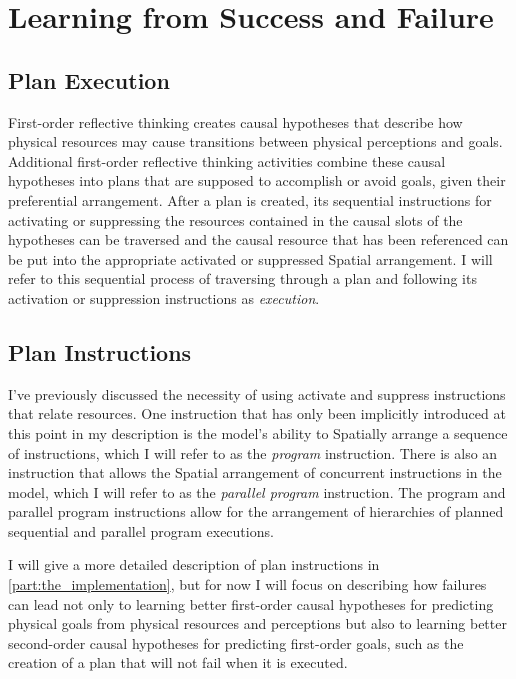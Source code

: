 \chapter{Learning from Success and Failure}
\label{chapter:learning_from_success_and_failure}

\section{Plan Execution}

First-order reflective thinking creates causal hypotheses that
describe how physical resources may cause transitions between physical
perceptions and goals.  Additional first-order reflective thinking
activities combine these causal hypotheses into plans that are
supposed to accomplish or avoid goals, given their preferential
arrangement.  After a plan is created, its sequential instructions for
activating or suppressing the resources contained in the causal slots
of the hypotheses can be traversed and the causal resource that has
been referenced can be put into the appropriate activated or
suppressed Spatial arrangement.  I will refer to this sequential
process of traversing through a plan and following its activation or
suppression instructions as \emph{execution}.

\section{Plan Instructions}

I've previously discussed the necessity of using activate and suppress
instructions that relate resources.  One instruction that has only
been implicitly introduced at this point in my description is the
model's ability to Spatially arrange a sequence of instructions, which
I will refer to as the \emph{program} instruction.  There is also an
instruction that allows the Spatial arrangement of concurrent
instructions in the model, which I will refer to as the \emph{parallel
  program} instruction.  The program and parallel program instructions
allow for the arrangement of hierarchies of planned sequential and
parallel program executions.

I will give a more detailed description of plan instructions in
\autoref{part:the_implementation}, but for now I will focus on
describing how failures can lead not only to learning better
first-order causal hypotheses for predicting physical goals from
physical resources and perceptions but also to learning better
second-order causal hypotheses for predicting first-order goals, such
as the creation of a plan that will not fail when it is executed.

